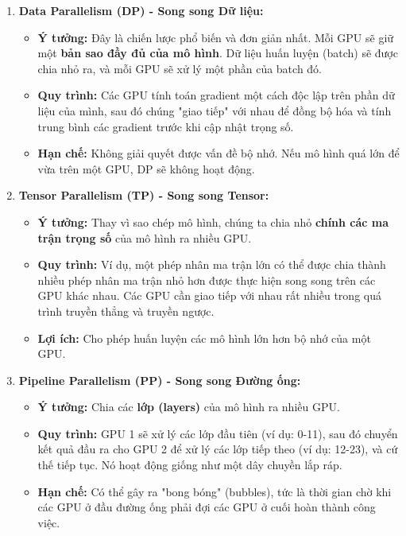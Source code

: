 \begin{enumerate}
    \item \textbf{Data Parallelism (DP) - Song song Dữ liệu:}
        \begin{itemize}
            \item \textbf{Ý tưởng:} Đây là chiến lược phổ biến và đơn giản nhất. Mỗi GPU sẽ giữ một \textbf{bản sao đầy đủ của mô hình}. Dữ liệu huấn luyện (batch) sẽ được chia nhỏ ra, và mỗi GPU sẽ xử lý một phần của batch đó.
            \item \textbf{Quy trình:} Các GPU tính toán gradient một cách độc lập trên phần dữ liệu của mình, sau đó chúng "giao tiếp" với nhau để đồng bộ hóa và tính trung bình các gradient trước khi cập nhật trọng số.
            \item \textbf{Hạn chế:} Không giải quyết được vấn đề bộ nhớ. Nếu mô hình quá lớn để vừa trên một GPU, DP sẽ không hoạt động.
        \end{itemize}
    \item \textbf{Tensor Parallelism (TP) - Song song Tensor:}
        \begin{itemize}
            \item \textbf{Ý tưởng:} Thay vì sao chép mô hình, chúng ta chia nhỏ \textbf{chính các ma trận trọng số} của mô hình ra nhiều GPU.
            \item \textbf{Quy trình:} Ví dụ, một phép nhân ma trận lớn có thể được chia thành nhiều phép nhân ma trận nhỏ hơn được thực hiện song song trên các GPU khác nhau. Các GPU cần giao tiếp với nhau rất nhiều trong quá trình truyền thẳng và truyền ngược.
            \item \textbf{Lợi ích:} Cho phép huấn luyện các mô hình lớn hơn bộ nhớ của một GPU.
        \end{itemize}
    \item \textbf{Pipeline Parallelism (PP) - Song song Đường ống:}
        \begin{itemize}
            \item \textbf{Ý tưởng:} Chia các \textbf{lớp (layers)} của mô hình ra nhiều GPU.
            \item \textbf{Quy trình:} GPU 1 sẽ xử lý các lớp đầu tiên (ví dụ: 0-11), sau đó chuyển kết quả đầu ra cho GPU 2 để xử lý các lớp tiếp theo (ví dụ: 12-23), và cứ thế tiếp tục. Nó hoạt động giống như một dây chuyền lắp ráp.
            \item \textbf{Hạn chế:} Có thể gây ra "bong bóng" (bubbles), tức là thời gian chờ khi các GPU ở đầu đường ống phải đợi các GPU ở cuối hoàn thành công việc.
        \end{itemize}
\end{enumerate}

